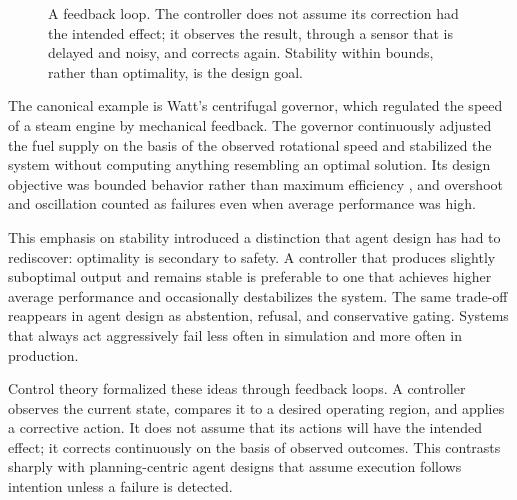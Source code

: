 \documentclass[11pt]{book}
\begin{document}
\begin{figure}[htbp]
\centering
{}
\caption{A feedback loop. The controller does not assume its correction had the intended effect; it observes the result, through a sensor that is delayed and noisy, and corrects again. Stability within bounds, rather than optimality, is the design goal.}
\label{fig:feedback}
\end{figure}

The canonical example is Watt's centrifugal governor, which regulated the speed of a steam engine by mechanical feedback. The governor continuously adjusted the fuel supply on the basis of the observed rotational speed and stabilized the system without computing anything resembling an optimal solution. Its design objective was bounded behavior rather than maximum efficiency \cite{bennett1979history}, and overshoot and oscillation counted as failures even when average performance was high.

This emphasis on stability introduced a distinction that agent design has had to rediscover: optimality is secondary to safety. A controller that produces slightly suboptimal output and remains stable is preferable to one that achieves higher average performance and occasionally destabilizes the system. The same trade-off reappears in agent design as abstention, refusal, and conservative gating. Systems that always act aggressively fail less often in simulation and more often in production.

Control theory formalized these ideas through feedback loops. A controller observes the current state, compares it to a desired operating region, and applies a corrective action. It does not assume that its actions will have the intended effect; it corrects continuously on the basis of observed outcomes. This contrasts sharply with planning-centric agent designs that assume execution follows intention unless a failure is detected.
\end{document}
